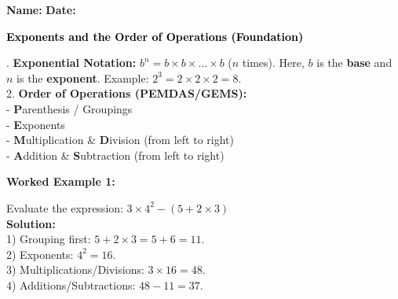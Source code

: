 \documentclass[12pt, letterpaper, fleqn]{article}
\begin{document}
\textbf{Name:} \underline{\hspace{5cm}}
\hfill
\textbf{Date:} \underline{\hspace{3cm}}\\

\begin{tcolorbox}[colback=black!10]
    \large\textcolor{black}{\textbf{Exponents and the Order of Operations (Foundation)}}
\end{tcolorbox}

\vspace{3mm}

. \textbf{Exponential Notation:} $b^n = b \times b \times \dots \times b$ ($n$ times). Here, $b$ is the \textbf{base} and $n$ is the \textbf{exponent}. Example: $2^3 = 2 \times 2 \times 2 = 8$. \\
2. \textbf{Order of Operations (PEMDAS/GEMS):} \\
- \textbf{P}arenthesis / Groupings \\
- \textbf{E}xponents \\
- \textbf{M}ultiplication \& \textbf{D}ivision (from left to right) \\
- \textbf{A}ddition \& \textbf{S}ubtraction (from left to right)

\vspace{4mm}

\begin{tcolorbox}[colback=white, colframe=black!25, boxrule=0.6pt, arc=4mm, left=6mm, right=6mm, top=5mm, bottom=5mm]
\textbf{Worked Example 1:}

\medskip
\noindent
Evaluate the expression: $3 \times 4^2 - (5 + 2 \times 3)$\\
\textbf{Solution:} \\
1) Grouping first: $5 + 2 \times 3 = 5 + 6 = 11$. \\
2) Exponents: $4^2 = 16$. \\
3) Multiplications/Divisions: $3 \times 16 = 48$. \\
4) Additions/Subtractions: $48 - 11 = 37$.
\end{tcolorbox}

\vspace{4mm}
\end{document}
